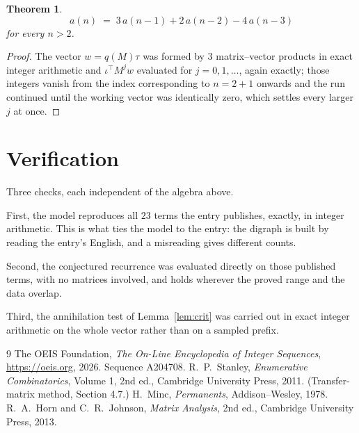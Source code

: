 \documentclass[11pt,a4paper]{article}
\theoremstyle{plain}
\newtheorem{theorem}{Theorem}
\theoremstyle{definition}
\begin{document}
\begin{theorem}
\[
a(n)\;=\;3\,a(n-1) + 2\,a(n-2) - 4\,a(n-3)
\]
for every $n>2$.
\end{theorem}

\begin{proof}
The vector $w=q(M)\tau$ was formed by $3$ matrix--vector products in exact integer
arithmetic and $\iota^{\!\top}M^{j}w$ evaluated for $j=0,1,\dots$, again exactly; those
integers vanish from the index corresponding to $n=2+1$ onwards and the run continued
until the working vector was identically zero, which settles every larger $j$ at once.
\end{proof}

\section{Verification}

Three checks, each independent of the algebra above.

First, the model reproduces all $23$ terms the entry publishes, exactly, in integer
arithmetic. This is what ties the model to the entry: the digraph is built by reading the
entry's English, and a misreading gives different counts.

Second, the conjectured recurrence was evaluated directly on those published terms, with no
matrices involved, and holds wherever the proved range and the data overlap.

Third, the annihilation test of Lemma~\ref{lem:crit} was carried out in exact integer
arithmetic on the whole vector rather than on a sampled prefix.

\begin{thebibliography}{9}
 The OEIS Foundation, \emph{The On-Line Encyclopedia of Integer
Sequences}, \url{https://oeis.org}, 2026. Sequence A204708.
 R.~P.~Stanley, \emph{Enumerative Combinatorics}, Volume 1, 2nd ed.,
Cambridge University Press, 2011. (Transfer-matrix method, Section 4.7.)
 H.~Minc, \emph{Permanents}, Addison--Wesley, 1978.
 R.~A.~Horn and C.~R.~Johnson, \emph{Matrix Analysis}, 2nd ed., Cambridge
University Press, 2013.
\end{thebibliography}
\end{document}
